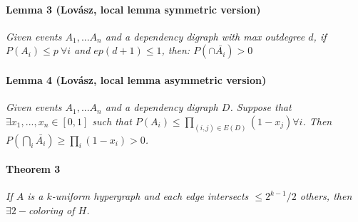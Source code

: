 \documentclass[a4paper,10pt]{article}
\begin{document}
\paragraph{Lemma 3 (Lovász, local lemma symmetric version)}
\textit{Given events $A_1,...A_n$ and a dependency digraph with max outdegree $d$, if $P(A_i) \leq p ~ \forall i$ and $ep(d+1) \leq 1$, then: $
	P(\cap \bar{A_i}) > 0$}

\paragraph{Lemma 4 (Lovász, local lemma asymmetric version)}
\textit{Given events $A_1,...A_n$ and a dependency digraph $D$. Suppose that $\exists x_1, ..., x_n \in [0,1]$ such that $P(A_i) \leq \prod_{(i,j) \in E(D)}(1 - x_j) \forall i$. Then $P(\bigcap_i \bar{A_i}) \geq \prod_i (1 - x_i) > 0$.}

\paragraph{Theorem 3} 
\textit{If $A$ is a $k$-uniform hypergraph and each edge intersects $\leq 2^{k-1}/2$ others, then $\exists 2-$coloring of $H$.}
\end{document}
